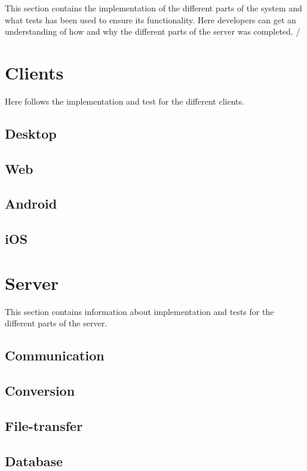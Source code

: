 
This section contains the implementation of the different parts of the system and what tests has been used to ensure its functionality. Here developers can get an understanding of how and why the different parts of the server was completed.
/
\section{Clients}
Here follows the implementation and test for the different clients.

\subsection{Desktop}

\FloatBarrier

\subsection{Web}

\FloatBarrier

\subsection{Android}

\FloatBarrier

\subsection{iOS}

\FloatBarrier

\section{Server}
This section contains information about implementation and tests for the different parts of the server.

\subsection{Communication}

\FloatBarrier

\subsection{Conversion}

\FloatBarrier


\subsection{File-transfer}

\FloatBarrier

\subsection{Database}

\FloatBarrier
